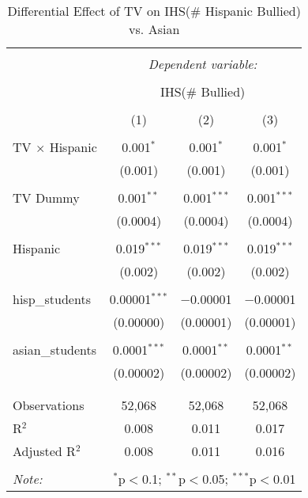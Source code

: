 
\begin{table}[!htbp] \centering 
  \caption{Differential Effect of TV on IHS(\# Hispanic Bullied) vs. Asian} 
  \label{} 
\begin{tabular}{@{\extracolsep{-2pt}}lccc} 
\\[-1.8ex]\hline 
\hline \\[-1.8ex] 
 & \multicolumn{3}{c}{\textit{Dependent variable:}} \\ 
\cline{2-4} 
\\[-1.8ex] & \multicolumn{3}{c}{IHS(\# Bullied)} \\ 
\\[-1.8ex] & (1) & (2) & (3)\\ 
\hline \\[-1.8ex] 
 TV $\times$ Hispanic & 0.001$^{*}$ & 0.001$^{*}$ & 0.001$^{*}$ \\ 
  & (0.001) & (0.001) & (0.001) \\ 
  & & & \\ 
 TV Dummy & 0.001$^{**}$ & 0.001$^{***}$ & 0.001$^{***}$ \\ 
  & (0.0004) & (0.0004) & (0.0004) \\ 
  & & & \\ 
 Hispanic & 0.019$^{***}$ & 0.019$^{***}$ & 0.019$^{***}$ \\ 
  & (0.002) & (0.002) & (0.002) \\ 
  & & & \\ 
 hisp\_students & 0.00001$^{***}$ & $-$0.00001 & $-$0.00001 \\ 
  & (0.00000) & (0.00001) & (0.00001) \\ 
  & & & \\ 
 asian\_students & 0.0001$^{***}$ & 0.0001$^{**}$ & 0.0001$^{**}$ \\ 
  & (0.00002) & (0.00002) & (0.00002) \\ 
  & & & \\ 
\hline \\[-1.8ex] 
Observations & 52,068 & 52,068 & 52,068 \\ 
R$^{2}$ & 0.008 & 0.011 & 0.017 \\ 
Adjusted R$^{2}$ & 0.008 & 0.011 & 0.016 \\ 
\hline 
\hline \\[-1.8ex] 
\textit{Note:}  & \multicolumn{3}{r}{$^{*}$p$<$0.1; $^{**}$p$<$0.05; $^{***}$p$<$0.01} \\ 
\end{tabular} 
\end{table} 
